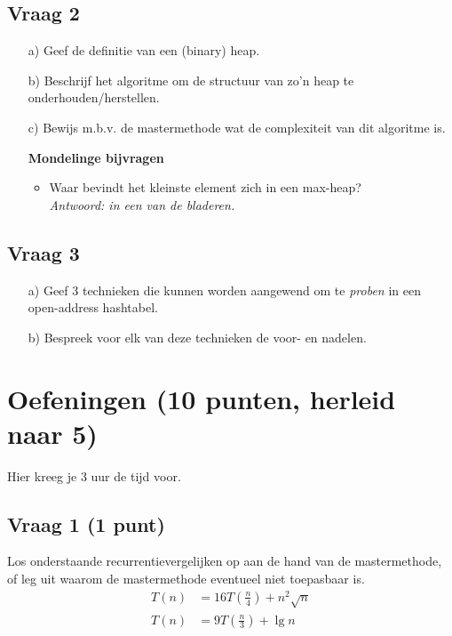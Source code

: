 \documentclass[kulak]{kulakarticle}
\begin{document}
	\subsection*{Vraag 2}

	\begin{enumerate}
		\item[a)] Geef de definitie van een (binary) heap.
		\item[b)] Beschrijf het algoritme om de structuur van zo'n heap te onderhouden/herstellen.
		\item[c)] Bewijs m.b.v. de mastermethode wat de complexiteit van dit algoritme is.
		\item[]\textbf{Mondelinge bijvragen}
		\begin{itemize}
			\item Waar bevindt het kleinste element zich in een max-heap?\\
			\textit{Antwoord: in een van de bladeren. }
		\end{itemize}
	\end{enumerate}

	\subsection*{Vraag 3}

	\begin{enumerate}
		\item[a)] Geef 3 technieken die kunnen worden aangewend om te \textit{proben} in een open-address hashtabel.
		\item[b)] Bespreek voor elk van deze technieken de voor- en nadelen.
	\end{enumerate}

	\newpage

	\section{Oefeningen (10 punten, herleid naar 5)}

	Hier kreeg je 3 uur de tijd voor.

	\subsection*{Vraag 1 (1 punt)}

	Los onderstaande recurrentievergelijken op aan de hand van de mastermethode, of leg uit waarom de mastermethode eventueel niet toepasbaar is.
	\begin{align*}
		T(n) &= 16 T \left(\frac{n}{4}\right) + n^2 \sqrt{n} \\
		T(n) &= 9 T \left(\frac{n}{3}\right) + \lg n
	\end{align*}
\end{document}
